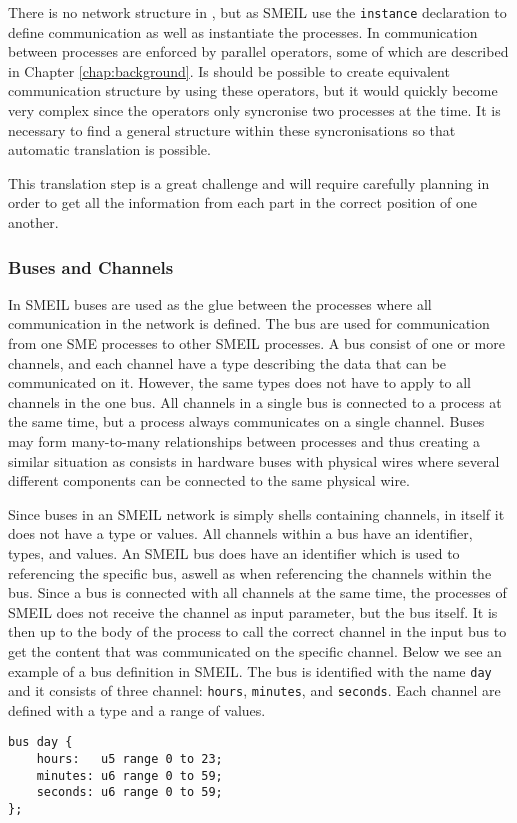 There is no network structure in \cspm{}, but as SMEIL use the \texttt{instance} declaration to define communication as well as instantiate the processes. In \cspm{} communication between processes are enforced by parallel operators, some of which are described in Chapter \ref{chap:background}. Is should be possible to create equivalent communication structure by using these operators, but it would quickly become very complex since the operators only syncronise two processes at the time. It is necessary to find a general structure within these syncronisations so that automatic translation is possible.

This translation step is a great challenge and will require carefully planning in order to get all the information from each part in the correct position of one another.

\subsubsection{Buses and Channels}
In SMEIL buses are used as the glue between the processes where all communication in the network is defined. The bus are used for communication from one SME processes to other SMEIL processes. A bus consist of one or more channels, and each channel have a type describing the data that can be communicated on it. However, the same types does not have to apply to all channels in the one bus. All channels in a single bus is connected to a process at the same time, but a process always communicates on a single channel.
Buses may form many-to-many relationships between processes and thus creating a similar situation as consists in hardware buses with physical wires where several different components can be connected to the same physical wire.

Since buses in an SMEIL network is simply shells containing channels, in itself it does not have a type or values. All channels within a bus have an identifier, types, and values. An SMEIL bus does have an identifier which is used to referencing the specific bus, aswell as when referencing the channels within the bus. Since a bus is connected with all channels at the same time, the processes of SMEIL does not receive the channel as input parameter, but the bus itself. It is then up to the body of the process to call the correct channel in the input bus to get the content that was communicated on the specific channel.
Below we see an example of a bus definition in SMEIL. The bus is identified with the name \texttt{day} and it consists of three channel: \texttt{hours}, \texttt{minutes}, and \texttt{seconds}. Each channel are defined with a type and a range of values.
\begin{verbatim}
bus day {
    hours:   u5 range 0 to 23;
    minutes: u6 range 0 to 59;
    seconds: u6 range 0 to 59;
};
\end{verbatim}

